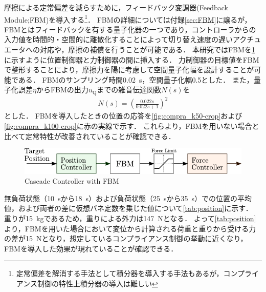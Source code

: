 摩擦による定常偏差を減らすために，フィードバック変調器(Feedback Module;FBM)を導入する\footnote{定常偏差を解消する手法として積分器を導入する手法もあるが，コンプライアンス制御の特性上積分器の導入は難しい}\cite{石川将人2007,石川将人2008フィードバック変調器を用いた離散値入力制御におけるアクチュエータ非線形性の補償}．
FBMの詳細については付録\ref{sec:FBM}に譲るが，FBMとはフィードバックを有する量子化器の一つであり，コントローラからの入力値を時間的・空間的に離散化することによって切り替え速度の遅いアクチュエータへの対応や，摩擦の補償を行うことが可能である\cite{石川将人2008フィードバック変調器を用いた離散値入力制御におけるアクチュエータ非線形性の補償,佐藤順紀2013不等間隔量子化入力とアクチュエータの非線形要素モデルを用いたフィードバック変調器による油圧駆動システムの軌道制御,Ohgi_2008jrm}．
本研究ではFBMを\figname\ref{fig:casquade_torqueandposition_FBM}に示すように位置制御器と力制御器の間に挿入する．
力制御器の目標値をFBMで整形することにより，摩擦力を陽に考慮して空間量子化幅を設計することが可能である．
FBMのサンプリング時間\SI{0.02}{s}，空間量子化幅0.5とした．
また，量子化誤差$\eta$からFBMの出力$u_\mathrm{Q}$までの雑音伝達関数$N(s)$を
\begin{align}
    \label{eq:Ns}
    N(s) = \left( \frac{0.022s}{0.022s+1} \right)^2
\end{align}
とした．
FBMを導入したときの位置の応答を\figname\ref{fig:compra_k50-crop}および\figname\ref{fig:compra_k100-crop}に赤の実線で示す．
これらより，FBMを用いない場合と比べて定常特性が改善されていることが確認できる．
\begin{figure}[t]
    \centering
        \includegraphics[keepaspectratio, scale=1.0]{contents/IntegrationControl/figure/casquade_torqueandposition_FBM.pdf}
        \caption{Cascade Controller with FBM}
        \label{fig:casquade_torqueandposition_FBM}
\end{figure}

無負荷状態（\SI{10}{s}から\SI{18}{s}）および負荷状態（\SI{25}{s}から\SI{35}{s}）での位置の平均値，および両者の差に仮想バネ定数を乗じた値について\tabname\ref{tab:position}に示す．
重りが\SI{15}{kg}であるため，重りによる外力は\SI{147}{N}となる．
よって\tabname\ref{tab:position}より，FBMを用いた場合において変位から計算される荷重と重りから受ける力の差が\SI{15}{N}となり，想定しているコンプライアンス制御の挙動に近くなり，FBMを導入した効果が現れていることが確認できる．

